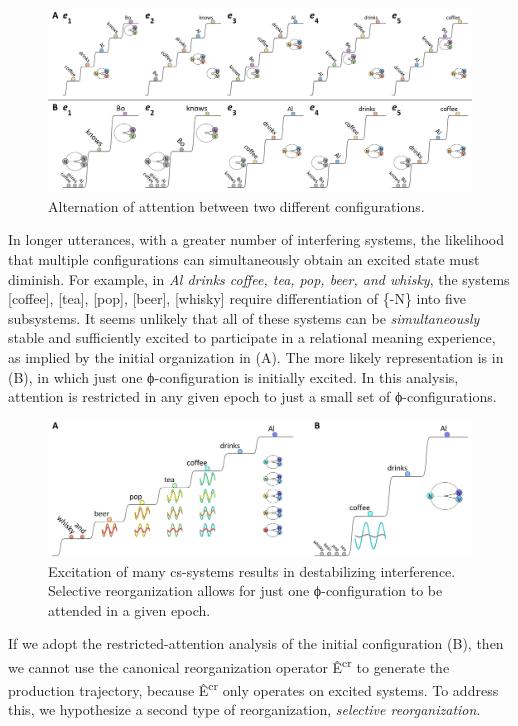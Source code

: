   
\begin{figure}
\includegraphics[width=\textwidth]{figures/Tilsen-img97.png}
\caption{Alternation of attention between two different configurations.}
\label{fig:4:47}
\end{figure}
 

  In longer utterances, with a greater number of interfering systems, the likelihood that multiple configurations can simultaneously obtain an excited state must diminish. For example, in \textit{Al drinks coffee, tea, pop, beer, and whisky}, the systems [coffee], [tea], [pop], [beer], [whisky] require differentiation of \{-N\} into five subsystems. It seems unlikely that all of these systems can be \textit{simultaneously} stable and sufficiently excited to participate in a relational meaning experience, as implied by the initial organization in {}(A). The more likely representation is in (B), in which just one ϕ-configuration is initially excited. In this analysis, attention is restricted in any given epoch to just a small set of ϕ-configurations.

  
\begin{figure}
\includegraphics[width=\textwidth]{figures/Tilsen-img98.png}
\caption{Excitation of many cs-systems results in destabilizing interference. Selective reorganization allows for just one ϕ-configuration to be attended in a given epoch.}
\label{fig:4:48}
\end{figure}
 

  If we adopt the restricted-attention analysis of the initial configuration (B), then we cannot use the canonical reorganization operator Ê\textsuperscript{cr} to generate the production trajectory, because Ê\textsuperscript{cr} only operates on excited systems. To address this, we hypothesize a second type of reorganization, \textit{selective reorganization}.

